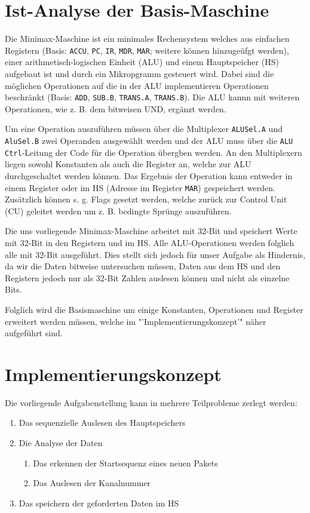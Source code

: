 \documentclass[12pt,titlepage]{article}
\begin{document}
\section{Ist-Analyse der Basis-Maschine}

Die Minimax-Maschine ist ein minimales Rechensystem welches aus einfachen Registern (Basis: \texttt{ACCU}, \texttt{PC}, \texttt{IR}, \texttt{MDR}, \texttt{MAR};
weitere k{\"o}nnen hinzuge{\"u}fgt werden), einer arithmetisch-logischen Einheit (ALU) und einem Hauptspeicher (HS) aufgebaut
ist und durch ein Mikropgramm gesteuert wird. Dabei sind die m{\"o}glichen Operationen auf die in der ALU implementieren
Operationen beschr{\"a}nkt (Basis: \texttt{ADD}, \texttt{SUB.B}, \texttt{TRANS.A}, \texttt{TRANS.B}). Die ALU kannn mit weiteren Operationen,
wie z. B. dem bitweisen UND, erg{\"a}nzt werden.


Um eine Operation auszuf{\"u}hren m{\"u}ssen {\"u}ber die Multiplexer \texttt{ALUSel.A} und \texttt{AluSel.B} zwei Operanden ausgew{\"a}hlt werden
und der ALU muss {\"u}ber die \texttt{ALU Ctrl}-Leitung der Code f{\"u}r die Operation {\"u}bergben werden. An den Multiplexern liegen sowohl
Konstanten als auch die Register an, welche zur ALU durchgeschaltet werden k{\"o}nnen. Das Ergebnis der Operation kann
entweder in einem Register oder im HS (Adresse im Register \texttt{MAR}) gespeichert werden. Zus{\"a}tzlich k{\"o}nnen s. g. Flags 
gesetzt werden, welche zur{\"u}ck zur Control Unit (CU) geleitet werden um z. B. bedingte Spr{\"u}nge auszuf{\"u}hren.


Die uns vorliegende Minimax-Maschine arbeitet mit 32-Bit und speichert Werte mit 32-Bit in den Registern und im HS.
Alle ALU-Operationen werden folglich alle mit 32-Bit ausgef{\"u}hrt. Dies stellt sich jedoch f{\"u}r unser Aufgabe als
Hindernis, da wir die Daten bitweise untersuchen m{\"u}ssen, Daten aus dem HS und den Registern jedoch nur als
32-Bit Zahlen auslesen k{\"o}nnen und nicht als einzelne Bits.

Folglich wird die Basismaschine um einige Konstanten, Operationen und Register erweitert werden müssen, welche im "'Implementierungskonzept'" n{\"a}her
aufgeführt sind.


\section{Implementierungskonzept}
Die vorliegende Aufgabenstellung kann in mehrere Teilprobleme zerlegt werden:
\begin{enumerate}
\item Das sequenzielle Auslesen des Hauptspeichers
\item Die Analyse der Daten
    \begin{enumerate}
    \item Das erkennen der Startsequenz eines neuen Pakets
    \item Das Auslesen der Kanalnummer
    \end{enumerate}
\item Das speichern der geforderten Daten im HS
\end{enumerate}
\end{document}
